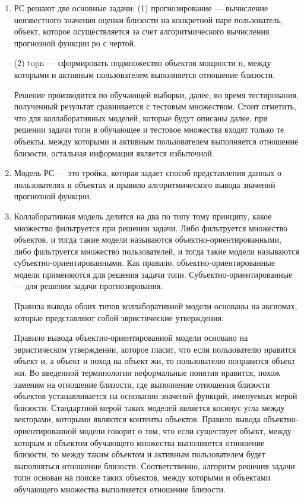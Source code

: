 \documentclass[a4paper,11pt]{proc}
\begin{document}
{\begin{enumerate}
	\item
		РС решают две основные задачи: (1) прогнозирование --- вычисление
	неизвестного значения оценки близости на конкретной паре пользователь, объект,
	которое осуществляется за счет алгоритмического вычисления прогнозной
	функции ро с чертой.

	(2) topn --- сформировать подмножество объектов мощности н,
	между которыми и активным пользователем выполняется отношение близости.

	Решение производится по обучающей выборки, далее, во время тестирования,
	полученный результат сравнивается с тестовым множеством.
	Стоит отметить, что для коллаборативных моделей, которые будут описаны
		далее, при решении задачи топн в обучающее и тестовое множества входят
		только те объекты, между которыми и активным пользователем выполняется
		отношение близости, остальная информация является избыточной.

	\item Модель РС --- это тройка, которая задает способ представления
		данных о пользователях и объектах и правило алгоритмического вывода
		значений прогнозной функции.

	\item Коллаборативная модель делится на два по типу тому принципу, какое
		множество фильтруется при решении задачи. Либо фильтруется множество
		объектов, и тогда такие модели называются объектно-ориентированными,
		либо фильтруется множество пользователей, и тогда такие модели
		называются субъектно-ориентированными. Как правило,
		объектно-ориентированные модели применяются для решения задачи топн.
		Субъектно-ориентированные --- для решения задачи прогнозирования.

		Правила вывода обоих типов коллаборативной модели основаны на
		аксиомах, которые представляют собой эвристические утверждения.

		Правило вывода объектно-ориентированной модели основано на
		эвристическом утверждении, которое гласит, что если пользователю
		нравится объект и, а объект и поход на объект жи, то пользователю
		понравится объект жи.
		Во введенной терминологии неформальные понятия
		нравится, похож заменим на отношение близости, где выполнение
		отношения близости объектов устанавливается на основании значений
		функций, именуемых мерой близости. Стандартной мерой таких моделей
		является косинус угла между векторами, которыми являются контенты
		объектов. Правило вывода
		объектно-ориентированной модели говорит о том, что если существует
		объект, между которым и объектом обучающего множества выполняется
		отношение близости, то между таким объектом и активным пользователем
		будет выполняться отношение близости. Соответственно, алгоритм решения
		задачи топн основан на поиске таких объектов, между которыми и
		объектами обучающего множества выполняется отношение близости.


\end{enumerate}}
\end{document}

